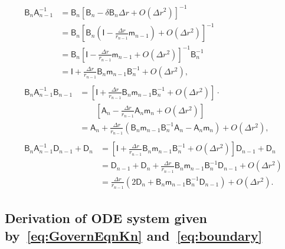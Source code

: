 \documentclass[preprint,10pt,times]{elsarticle}
\numberwithin{equation}{section}
\renewcommand{\u}[1]{\boldsymbol{#1}}
\newcommand{\usf}[1]{\u{\mathsf #1}}
\renewcommand{\>}{$\Rightarrow$}
\begin{document}
\begin{subequations}
	\begin{align}
	\begin{split}
		\usf{B}_n \usf{A}^{-1}_{n-1}
		& = \usf{B}_n \left[ \usf{B}_{n} - \delta \usf{B}_{n} \Delta r + O(\Delta r^2) \right]^{-1} \\
		& = \usf{B}_n \left[ \usf{B}_{n} \left( \usf{I}- \frac{\Delta r}{r_{n-1}} \usf{m}_{n-1} \right) + O(\Delta r^2) \right]^{-1} \\
		& = \usf{B}_n \left[ \usf{I} - \frac{\Delta r}{r_{n-1}} \usf{m}_{n-1} + O(\Delta r^2) \right]^{-1} \usf{B}^{-1}_{n} \\
		& = \usf{I} + \frac{\Delta r}{r_{n-1}} \usf{B}_n \usf{m}_{n-1} \usf{B}^{-1}_n + O(\Delta r^2),
	\end{split}\\
	\begin{split}
		\usf{B}_n \usf{A}^{-1}_{n-1} \usf{B}_{n-1}
		& = \left[ \usf{I} + \frac{\Delta r}{r_{n-1}} \usf{B}_n \usf{m}_{n-1} \usf{B}^{-1}_n + O(\Delta r^2) \right] \cdot \\
		& \qquad \left[ \usf{A}_{n} - \frac{\Delta r}{r_{n-1}} \usf{A}_n \usf{m}_n + O(\Delta r^2) \right] \\
		& = \usf{A}_{n} + \frac{\Delta r}{r_{n-1}} \left( \usf{B}_n \usf{m}_{n-1} \usf{B}^{-1}_n \usf{A}_{n} - \usf{A}_n \usf{m}_n \right) + O(\Delta r^2),
	\end{split} \\
	\begin{split}
		\usf{B}_n \usf{A}^{-1}_{n-1} \usf{D}_{n-1} + \usf{D}_n
		& = \left[ \usf{I} + \frac{\Delta r}{r_{n-1}} \usf{B}_n \usf{m}_{n-1} \usf{B}^{-1}_n + O(\Delta r^2) \right] \usf{D}_{n-1} + \usf{D}_n \\
		& = \usf{D}_{n-1} + \usf{D}_n + \frac{\Delta r}{r_{n-1}} \usf{B}_n \usf{m}_{n-1} \usf{B}^{-1}_n \usf{D}_{n-1} + O(\Delta r^2) \\
		& = \frac{\Delta r}{r_{n-1}} \left( 2\usf{D}_n + \usf{B}_n \usf{m}_{n-1} \usf{B}^{-1}_n \usf{D}_{n-1} \right) + O(\Delta r^2).
	\end{split}
	\end{align}
	\label{eq:C5}
\end{subequations}

\subsection{Derivation of ODE system given by~\eqref{eq:GovernEqnKn} and~\eqref{eq:boundary}}
\label{Appen:GovernEqnKn}
\end{document}
